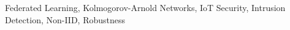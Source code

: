 \documentclass[journal]{IEEEtran}
\begin{document}
\begin{IEEEkeywords}
Federated Learning, Kolmogorov-Arnold Networks, IoT Security, Intrusion Detection, Non-IID, Robustness
\end{IEEEkeywords}










\end{document}

